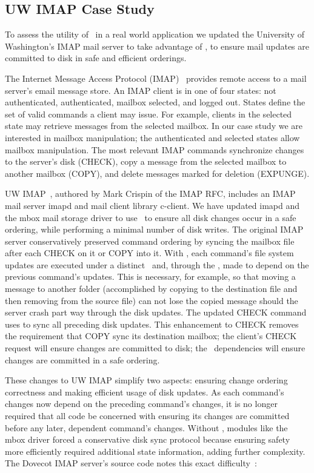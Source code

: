 \subsection{UW IMAP Case Study}
\label{sec:opgroup:uwimap}

To assess the utility of \opgroups\ in a real world application we
updated the University of Washington's IMAP mail server to take
advantage of \opgroups, to ensure mail updates are committed to disk
in safe and efficient orderings.

The Internet Message Access Protocol (IMAP)~\cite{rfc3501} provides
remote access to a mail server's email message store. An IMAP client
is in one of four states: not authenticated, authenticated, mailbox
selected, and logged out. States define the set of valid commands a
client may issue. For example, clients in the selected state may
retrieve messages from the selected mailbox. In our case study we are
interested in mailbox manipulation; the authenticated and selected
states allow mailbox manipulation. The most relevant IMAP commands
synchronize changes to the server's disk (CHECK), copy a message from
the selected mailbox to another mailbox (COPY), and delete messages
marked for deletion (EXPUNGE).

UW IMAP~\cite{uwimap}, authored by Mark Crispin of the IMAP RFC,
includes an IMAP mail server imapd and mail client library c-client.
We have updated imapd and the mbox mail storage driver to use
\opgroups\ to ensure all disk changes occur in a safe ordering, while
performing a minimal number of disk writes.
%
The original IMAP server conservatively preserved command ordering by
syncing the mailbox file after each CHECK on it or COPY into it. With
\opgroups, each command's file system updates are executed under a
distinct \opgroup\ and, through the \opgroup, made to depend on the
previous command's updates. This is necessary, for example, so that
moving a message to another folder (accomplished by copying to the
destination file and then removing from the source file) can not lose
the copied message should the server crash part way through the disk
updates.
%
The updated CHECK command uses \opgroupSync to sync all preceding disk
updates. This enhancement to CHECK removes the requirement that COPY
sync its destination mailbox; the client's CHECK request will ensure
changes are committed to disk; the \opgroup\ dependencies will ensure
changes are committed in a safe ordering.

These changes to UW IMAP simplify two aspects:
%
ensuring change ordering correctness
%
and making efficient usage of disk updates.
%
As each command's changes now depend on the preceding command's
changes, it is no longer required that all code be concerned with
ensuring its changes are committed before any later, dependent
command's changes. Without \opgroups, modules like the mbox driver
forced a conservative disk sync protocol because ensuring safety more
efficiently required additional state information, adding further
complexity. The Dovecot IMAP server's source code notes this exact
difficulty~\cite[maildir-save.c]{dovecot}:

